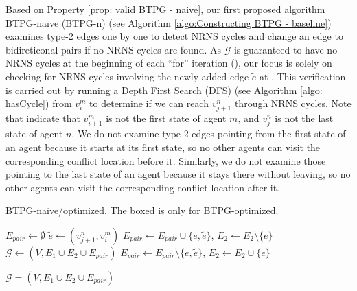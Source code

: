 \documentclass[letterpaper]{article} %
\theoremstyle{definition}
\begin{document}
Based on Property \ref{prop: valid BTPG - naive}, our first proposed algorithm BTPG-naïve (BTPG-n) (see Algorithm \ref{algo:Constructing BTPG - baseline}) examines type-2 edges one by one to detect NRNS cycles and change an edge to bidireticonal pairs if no NRNS cycles are found. As $\mathcal{G}$ is guaranteed to have no NRNS cycles at the beginning of each ``for'' iteration (), our focus is solely on checking for NRNS cycles involving the newly added edge $\tilde{e}$ at . This verification is carried out by running a Depth First Search (DFS) (see Algorithm \ref{algo: hasCycle}) from $v_{i}^m$ to determine if we can reach $v_{j+1}^n$ through NRNS cycles.
Note that  indicate that $v_{i+1}^m$ is not the first state of agent $m$, and $v_{j}^n$ is not the last state of agent $n$. We do not examine type-2 edges pointing from the first state of an agent because it starts at its first state, so no other agents can visit the corresponding conflict location before it. Similarly, we do not examine those pointing to the last state of an agent because it stays there without leaving, so no other agents can visit the corresponding conflict location after it.
\begin{algorithm}[t!]
        \caption{BTPG-naïve/optimized. The boxed  is only for BTPG-optimized.}

        \label{algo:Constructing BTPG - baseline}

        \LinesNumbered
        \texttt{$E_{pair} \gets \emptyset$}
        \While{\label{line:Epair-updated}}
        {
            {
                \texttt{$\tilde{e} \gets (v_{j+1}^n, v_{i}^m)$}\label{line:e-tilde}
                $E_{pair} \gets E_{pair} \cup \{e,\tilde{e}\}$,
                $E_2 \gets E_2 \setminus \{e\}$\;
                $\mathcal{G}\gets(V,E_1 \cup E_2 \cup E_{pair})$\;
                {
                    $E_{pair} \gets E_{pair} \setminus \{e,\tilde{e}\}$,
                    $E_2 \gets E_2 \cup \{e\}$\;
                 }
            }
        }

        \Return $\mathcal{G}=(V,E_1 \cup E_2 \cup E_{pair})$\;
\end{algorithm}
\end{document}
